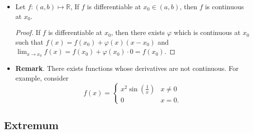 \documentclass{article}
\newcommand{\R}{\mathbb{R}}
\newcommand{\?}{\stackrel{?}{=}}
\theoremstyle{definition} %
\begin{document}
\begin{itemize}
\begin{proof}
\begin{align*}
            \lim_{x \to x_0} \frac{f(x) - f(x_0)}{x - x_0} = \lim_{x \to x_0} \varphi(x) &= \varphi(x_0) \longleftarrow \varphi \text{ continuous at } x_0 \\
            &\rightarrow f'(x_0) = \varphi(x_0).
        \end{align*}
        Next, suppose $f'(x_0)$ is well-defined. In particular, set
        \[
        \varphi = \begin{cases}
            \frac{f(x) - f(x_0)}{x - x_0} & x \neq x_0 \\
            f'(x_0) & x = x_0.
        \end{cases}
        \]
        Clearly, $\varphi(x)$ is continuous at $x_0$, so
        $$\lim_{x \to x_0} \varphi(x) = \lim_{x \to x_0} \frac{f(x) - f(x_0)}{x - x_0} = f'(x_0) = \varphi(x_0).$$
        On the other hand, when $x \neq x_0$, we have
        \begin{alignat*}{2}
            && \varphi(x) &= \frac{f(x) - f(x_0)}{x - x_0} \\
            \iff&& f(x) &= f(x_0) + \varphi(x_0)(x - x_0) \\
            \iff&& f(x) &= f(x_0) + \varphi(x)(x - x_0).
        \end{alignat*}
    \end{proof}
    \item[]
    \begin{lemma}
        Let $f: (a, b) \mapsto \R$, If $f$ is differentiable at $x_0 \in (a, b)$, then $f$ is continuous at $x_0$.
    \end{lemma}
    \begin{proof}
        If $f$ is differentiable at $x_0$, then there exists $\varphi$ which is continuous at $x_0$ such that $f(x) = f(x_0) + \varphi(x)(x - x_0)$ and $\lim_{x \to x_0} f(x) = f(x_0) + \varphi(x_0) \cdot 0 = f(x_0)$.
    \end{proof}
    \item \textbf{Remark}. There exists functions whose derivatives are not continuous. For example, consider
    \[
    f(x) =
    \begin{cases}
        x^2 \sin\left(\frac{1}{x}\right) & x \neq 0 \\
        0 & x = 0.
    \end{cases}
    \]
\end{itemize}

\subsection{Extremum}
\end{document}

